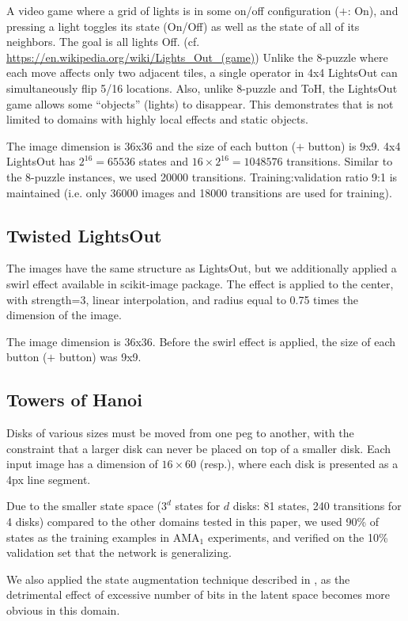 \documentclass[11pt]{article}
\begin{document}
A video game where a grid of lights is in some on/off configuration ($+$: On),
and pressing a light toggles its state (On/Off) as well as the state of all of its neighbors.
The goal is all lights Off.
(cf. \url{https://en.wikipedia.org/wiki/Lights_Out_(game)})
Unlike the 8-puzzle where each move affects only two adjacent tiles, a single operator in 4x4 LightsOut  can simultaneously flip 5/16 locations.
Also, unlike 8-puzzle and ToH, the LightsOut game allows some ``objects'' (lights) to disappear.
This demonstrates that \latentplanner is not limited to domains with highly local effects and static objects.

The image dimension is 36x36 and the size of each button ($+$ button) is 9x9.
4x4 LightsOut has $2^{16}=65536$ states and $16\times 2^{16}=1048576$ transitions.
Similar to the 8-puzzle instances, we used 20000 transitions.
Training:validation ratio 9:1 is maintained (i.e. only 36000 images and 18000 transitions are used for training).

\subsection{Twisted LightsOut}

The images have the same structure as LightsOut, but 
we additionally applied a swirl effect available in scikit-image package.
The effect is applied to the center, with strength=3, linear interpolation, 
and radius equal to 0.75 times the dimension of the image.

The image dimension is 36x36. 
Before the swirl effect is applied,
the size of each button ($+$ button) was 9x9.

\subsection{Towers of Hanoi}

Disks of various sizes must be moved from one peg to another, with the
constraint that a larger disk can never be placed on top of a
smaller disk.
Each input image has a dimension of $16\times 60$ (resp.),
where each disk is presented as a 4px line segment.

Due to the smaller state space ($3^d$ states for $d$ disks: 81 states, 240 transitions for 4 disks)
compared to the other domains tested in this paper,
we used 90\% of states as the training examples in AMA$_1$ experiments,
and verified on the 10\% validation set that the network is generalizing.

We also applied the state augmentation technique described in ,
as the detrimental effect of excessive number of bits in the latent space becomes more obvious in this domain.
\end{document}
